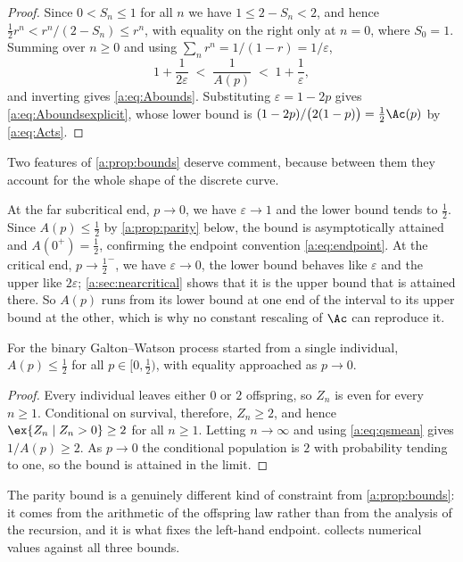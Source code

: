 \begin{proof}
Since $0<S_n\le1$ for all $n$ we have $1\le2-S_n<2$, and hence
$\tfrac12r^n < r^n/(2-S_n)\le r^n$, with equality on the right only at $n=0$, where
$S_0=1$. Summing over $n\ge0$ and using $\sum_nr^n = 1/(1-r) = 1/\varepsilon$,
\begin{equation*}
1+\frac{1}{2\varepsilon} \;<\; \frac{1}{A(p)} \;<\; 1+\frac{1}{\varepsilon},
\end{equation*}
and inverting gives \cref{a:eq:Abounds}. Substituting $\varepsilon=1-2p$ gives
\cref{a:eq:Aboundsexplicit}, whose lower bound is
$(1-2p)/\bigl(2(1-p)\bigr) = \tfrac12\Ac(p)$ by \cref{a:eq:Acts}.
\end{proof}

Two features of \cref{a:prop:bounds} deserve comment, because between them they
account for the whole shape of the discrete curve.

At the far subcritical end, $p\to0$, we have $\varepsilon\to1$ and the lower bound
tends to $\tfrac12$. Since $A(p)\le\tfrac12$ by \cref{a:prop:parity} below, the
bound is asymptotically attained and $A(0^+)=\tfrac12$, confirming the endpoint
convention \cref{a:eq:endpoint}. At the critical end, $p\to\tfrac12^-$, we have
$\varepsilon\to0$, the lower bound behaves like $\varepsilon$ and the upper like
$2\varepsilon$; \cref{a:sec:nearcritical} shows that it is the upper bound that is
attained there. So $A(p)$ runs from its lower bound at one end of the interval to
its upper bound at the other, which is why no constant rescaling of $\Ac$ can
reproduce it.

\begin{proposition}
\label{a:prop:parity}
For the binary Galton--Watson process started from a single individual,
$A(p)\le\tfrac12$ for all $p\in[0,\tfrac12)$, with equality approached as $p\to0$.
\end{proposition}

\begin{proof}
Every individual leaves either $0$ or $2$ offspring, so $Z_n$ is even for every
$n\ge1$. Conditional on survival, therefore, $Z_n\ge2$, and hence
$\ex{Z_n\mid Z_n>0}\ge2$ for all $n\ge1$. Letting $n\to\infty$ and using
\cref{a:eq:qsmean} gives $1/A(p)\ge2$. As $p\to0$ the conditional population is $2$
with probability tending to one, so the bound is attained in the limit.
\end{proof}

The parity bound is a genuinely different kind of constraint from
\cref{a:prop:bounds}: it comes from the arithmetic of the offspring law rather than
from the analysis of the recursion, and it is what fixes the left-hand endpoint.
 collects numerical values against all three bounds.

